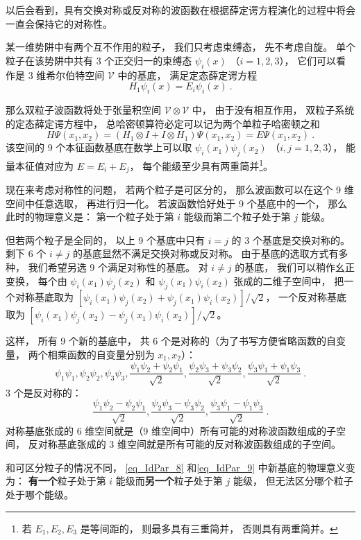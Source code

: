以后会看到，具有交换对称或反对称的波函数在根据薛定谔方程演化的过程中将会一直会保持它的对称性。 %

\begin{example}{}
某一维势阱中有两个互不作用的粒子， 我们只考虑束缚态， 先不考虑自旋。 单个粒子在该势阱中共有 3 个正交归一的束缚态 $\psi_i(x)$ （$i=1,2,3$）， 它们可以看作是 3 维希尔伯特空间 $\mathcal V$ 中的基底， 满足定态薛定谔方程
\begin{equation}
H_1 \psi_i(x) = E_i \psi_i(x)~.
\end{equation}

那么双粒子波函数将处于张量积空间 $\mathcal V\otimes \mathcal V$ 中， 由于没有相互作用，  双粒子系统的定态薛定谔方程中， 总哈密顿算符必定可以记为两个单粒子哈密顿之和
\begin{equation}
H\Psi(x_1, x_2) = (H_1\otimes I + I \otimes H_1)\Psi(x_1, x_2) = E \Psi(x_1, x_2)~.
\end{equation}
该空间的 9 个本征函数基底在数学上可以取 $\psi_i(x_1) \psi_j(x_2)$ （$i,j=1,2,3$）， 能量本征值对应为 $E = E_i + E_j$， 每个能级至少具有两重简并\footnote{若 $E_1, E_2, E_3$ 是等间距的， 则最多具有三重简并， 否则具有两重简并。}。

现在来考虑对称性的问题， 若两个粒子是可区分的， 那么波函数可以在这个 9 维空间中任意选取， 再进行归一化。 若波函数恰好处于 9 个基底中的一个， 那么此时的物理意义是： 第一个粒子处于第 $i$ 能级而第二个粒子处于第 $j$ 能级。

但若两个粒子是全同的， 以上 9 个基底中只有 $i = j$ 的 3 个基底是交换对称的。 剩下 6 个 $i\ne j$ 的基底显然不满足交换对称或反对称。 由于基底的选取方式有多种， 我们希望另选 9 个满足对称性的基底。 对 $i\ne j$ 的基底， 我们可以稍作幺正变换， 每个由 $\psi_i(x_1)\psi_j(x_2)$ 和 $\psi_j(x_1)\psi_i(x_2)$ 张成的二维子空间中， 把一个对称基底取为 $[\psi_i(x_1) \psi_j(x_2) + \psi_j(x_1) \psi_i(x_2)]/\sqrt{2}$， 一个反对称基底取为 $[\psi_i(x_1) \psi_j(x_2) - \psi_j(x_1) \psi_i(x_2)]/\sqrt{2}$。

这样， 所有 9 个新的基底中， 共 6 个是对称的（为了书写方便省略函数的自变量， 两个相乘函数的自变量分别为 $x_1, x_2$）：
\begin{equation}\label{eq_IdPar_8}
\psi_1\psi_1, \psi_2\psi_2, \psi_3\psi_3,
\frac{\psi_1\psi_2+\psi_2\psi_1}{\sqrt 2},
\frac{\psi_2\psi_3+\psi_3\psi_2}{\sqrt 2},
\frac{\psi_3\psi_1+\psi_1\psi_3}{\sqrt 2}~.
\end{equation}
3 个是反对称的：
\begin{equation}\label{eq_IdPar_9}
\frac{\psi_1\psi_2-\psi_2\psi_1}{\sqrt 2},
\frac{\psi_2\psi_3-\psi_3\psi_2}{\sqrt 2},
\frac{\psi_3\psi_1-\psi_1\psi_3}{\sqrt 2}~.
\end{equation}
对称基底张成的 6 维空间就是（9 维空间中）所有可能的对称波函数组成的子空间， 反对称基底张成的 3 维空间就是所有可能的反对称波函数组成的子空间。

和可区分粒子的情况不同， \autoref{eq_IdPar_8} 和\autoref{eq_IdPar_9} 中新基底的物理意义变为： \textbf{有一个}粒子处于第 $i$ 能级而\textbf{另一个}粒子处于第 $j$ 能级， 但无法区分哪个粒子处于哪个能级。
\end{example}

